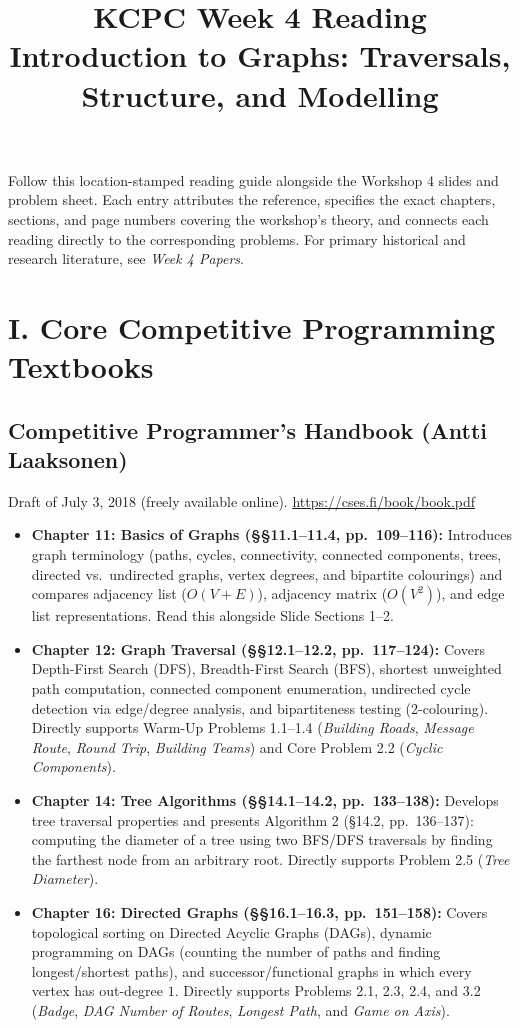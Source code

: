 \documentclass[11pt]{article}
\title{KCPC Week 4 Reading\\Introduction to Graphs: Traversals, Structure, and Modelling}
\author{}
\date{}
\begin{document}
\maketitle
\thispagestyle{fancy}

\noindent
Follow this location-stamped reading guide alongside the Workshop 4 slides and problem sheet. Each entry attributes the reference, specifies the exact chapters, sections, and page numbers covering the workshop's theory, and connects each reading directly to the corresponding problems. For primary historical and research literature, see \emph{Week 4 Papers}.

\section*{I. Core Competitive Programming Textbooks}

\subsection*{Competitive Programmer's Handbook (Antti Laaksonen)}
Draft of July 3, 2018 (freely available online). \url{https://cses.fi/book/book.pdf}

\begin{itemize}
    \item \textbf{Chapter 11: Basics of Graphs (\S\S 11.1--11.4, pp.~109--116):}
    Introduces graph terminology (paths, cycles, connectivity, connected components, trees, directed vs.\ undirected graphs, vertex degrees, and bipartite colourings) and compares adjacency list ($O(V + E)$), adjacency matrix ($O(V^2)$), and edge list representations. Read this alongside Slide Sections 1--2.
    \item \textbf{Chapter 12: Graph Traversal (\S\S 12.1--12.2, pp.~117--124):}
    Covers Depth-First Search (DFS), Breadth-First Search (BFS), shortest unweighted path computation, connected component enumeration, undirected cycle detection via edge/degree analysis, and bipartiteness testing (2-colouring). Directly supports Warm-Up Problems 1.1--1.4 (\emph{Building Roads}, \emph{Message Route}, \emph{Round Trip}, \emph{Building Teams}) and Core Problem 2.2 (\emph{Cyclic Components}).
    \item \textbf{Chapter 14: Tree Algorithms (\S\S 14.1--14.2, pp.~133--138):}
    Develops tree traversal properties and presents Algorithm 2 (\S 14.2, pp.~136--137): computing the diameter of a tree using two BFS/DFS traversals by finding the farthest node from an arbitrary root. Directly supports Problem 2.5 (\emph{Tree Diameter}).
    \item \textbf{Chapter 16: Directed Graphs (\S\S 16.1--16.3, pp.~151--158):}
    Covers topological sorting on Directed Acyclic Graphs (DAGs), dynamic programming on DAGs (counting the number of paths and finding longest/shortest paths), and successor/functional graphs in which every vertex has out-degree $1$. Directly supports Problems 2.1, 2.3, 2.4, and 3.2 (\emph{Badge}, \emph{DAG Number of Routes}, \emph{Longest Path}, and \emph{Game on Axis}).
\end{itemize}
\end{document}
